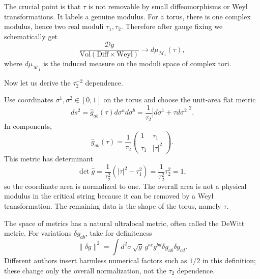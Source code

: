 \documentclass[
  10pt,
  a4paper,
  openany]{book}
\begin{document}
The crucial point is that \(\tau\) is not removable by small
diffeomorphisms or Weyl transformations. It labels a genuine modulus.
For a torus, there is one complex modulus, hence two real moduli
\(\tau_1,\tau_2\). Therefore after gauge fixing we schematically get \[
\frac{\mathcal D g}{\mathrm{Vol}(\mathrm{Diff}\times \mathrm{Weyl})}
\longrightarrow
d\mu_{\mathcal M_1}(\tau),
\] where \(d\mu_{\mathcal M_1}\) is the induced measure on the moduli
space of complex tori.

Now let us derive the \(\tau_2^{-2}\) dependence.

Use coordinates \(\sigma^1,\sigma^2\in[0,1]\) on the torus and choose
the unit-area flat metric \[
ds^2
=
\hat g_{ab}(\tau)d\sigma^a d\sigma^b
=
\frac{1}{\tau_2}\left|d\sigma^1+\tau d\sigma^2\right|^2.
\] In components, \[
\hat g_{ab}(\tau)
=
\frac{1}{\tau_2}
\begin{pmatrix}
1 & \tau_1\\
\tau_1 & |\tau|^2
\end{pmatrix}.
\] This metric has determinant \[
\det \hat g
=
\frac{1}{\tau_2^2}\left(|\tau|^2-\tau_1^2\right)
=
\frac{1}{\tau_2^2}\tau_2^2
=1,
\] so the coordinate area is normalized to one. The overall area is not
a physical modulus in the critical string because it can be removed by a
Weyl transformation. The remaining data is the shape of the torus,
namely \(\tau\).

The space of metrics has a natural ultralocal metric, often called the
DeWitt metric. For variations \(\delta g_{ab}\), take for definiteness
\[
\|\delta g\|^2
=
\int d^2\sigma\,\sqrt g\,
g^{ac}g^{bd}\delta g_{ab}\delta g_{cd}.
\] Different authors insert harmless numerical factors such as \(1/2\)
in this definition; these change only the overall normalization, not the
\(\tau_2\) dependence.
\end{document}

